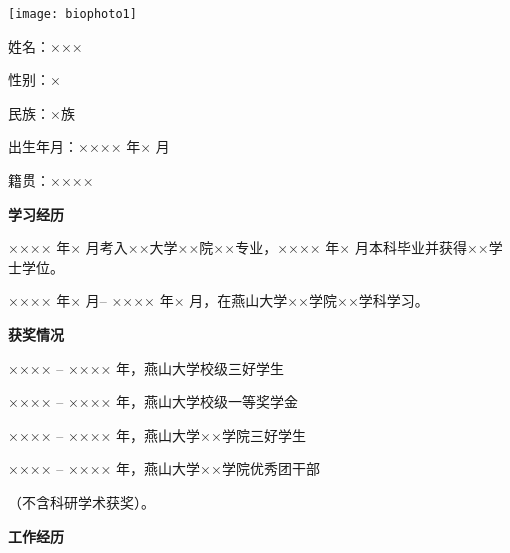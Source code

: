 \begin{resume}
\vspace*{\baselineskip}
\noindent
\begin{minipage}[t]{4cm}
\vspace{-\baselineskip}
\texttt{[image: biophoto1]}
\end{minipage}%
\hfill%
\begin{minipage}[t]{13cm}
\vspace{-\baselineskip}
姓\qquad 名：×××

性\qquad 别：×

民\qquad 族：×族

出生年月：×××× 年× 月

籍\qquad 贯：××××
\end{minipage}
\vspace*{\baselineskip}

\textbf{学习经历}   %

×××× 年× 月考入××大学××院××专业，×××× 年× 月本科毕业并获得××学士学位。

×××× 年× 月-- ×××× 年× 月，在燕山大学××学院××学科学习。

\textbf{获奖情况}   %

×××× -- ×××× 年，燕山大学校级三好学生

×××× -- ×××× 年，燕山大学校级一等奖学金

×××× -- ×××× 年，燕山大学××学院三好学生

×××× -- ×××× 年，燕山大学××学院优秀团干部

（不含科研学术获奖）。

\textbf{工作经历}   %

\end{resume}
